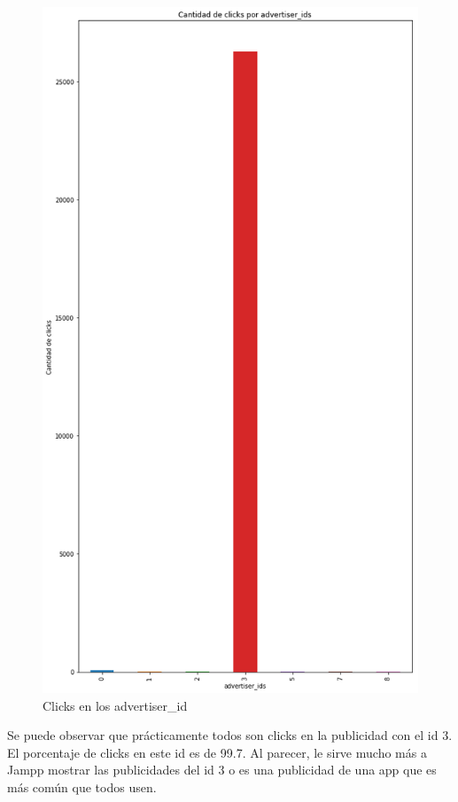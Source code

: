 \documentclass[a4paper, 12pt]{article}
\newcommand\tab[1][1cm]{\hspace*{#1}}
\begin{document}
		\FloatBarrier
		\begin{figure}[h]
			\centering
			\includegraphics[width=\textwidth]{images/clicks/clicks_advertiser_id.png}
			\caption{Clicks en los advertiser_id}
		\end{figure}
		\FloatBarrier

		\tab Se puede observar que prácticamente todos son clicks en la publicidad con el id 3. El porcentaje de clicks en este id es de 99.7. Al parecer, le sirve mucho más a Jampp mostrar las publicidades del id 3 o es una publicidad de una app que es más común que todos usen.
\end{document}

